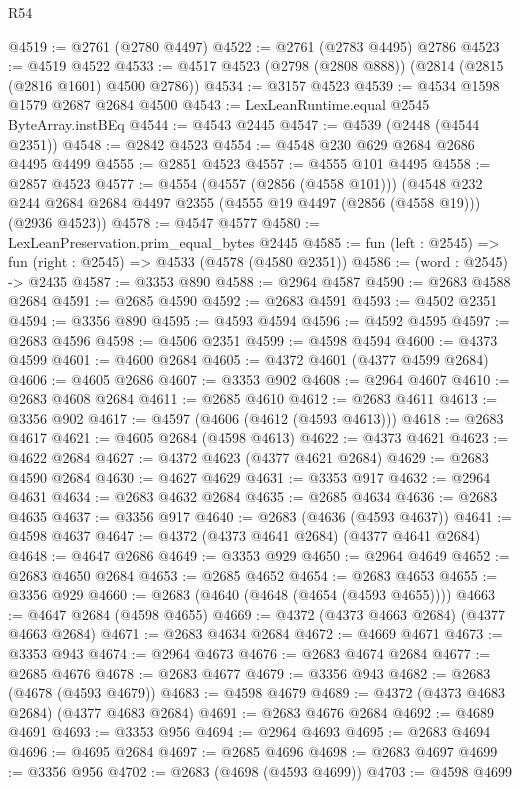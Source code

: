 \begin{lexlean}{R54}
\begin{coremodule}
@4519 := @2761 (@2780 @4497)
@4522 := @2761 (@2783 @4495) @2786
@4523 := @4519 @4522
@4533 := @4517 @4523 (@2798 (@2808 @888)) (@2814 (@2815 (@2816 @1601) @4500 @2786))
@4534 := @3157 @4523
@4539 := @4534 @1598 @1579 @2687 @2684 @4500
@4543 := LexLeanRuntime.equal @2545 ByteArray.instBEq
@4544 := @4543 @2445
@4547 := @4539 (@2448 (@4544 @2351))
@4548 := @2842 @4523
@4554 := @4548 @230 @629 @2684 @2686 @4495 @4499
@4555 := @2851 @4523
@4557 := @4555 @101 @4495
@4558 := @2857 @4523
@4577 := @4554
    (@4557 (@2856 (@4558 @101)))
    (@4548 @232 @244 @2684 @2684 @4497 @2355 (@4555 @19 @4497 (@2856 (@4558 @19))) (@2936 @4523))
@4578 := @4547 @4577
@4580 := LexLeanPreservation.prim_equal_bytes @2445
@4585 := fun (left : @2545) => fun (right : @2545) => @4533 (@4578 (@4580 @2351))
@4586 := (word : @2545) -> @2435
@4587 := @3353 @890
@4588 := @2964 @4587
@4590 := @2683 @4588 @2684
@4591 := @2685 @4590
@4592 := @2683 @4591
@4593 := @4502 @2351
@4594 := @3356 @890
@4595 := @4593 @4594
@4596 := @4592 @4595
@4597 := @2683 @4596
@4598 := @4506 @2351
@4599 := @4598 @4594
@4600 := @4373 @4599
@4601 := @4600 @2684
@4605 := @4372 @4601 (@4377 @4599 @2684)
@4606 := @4605 @2686
@4607 := @3353 @902
@4608 := @2964 @4607
@4610 := @2683 @4608 @2684
@4611 := @2685 @4610
@4612 := @2683 @4611
@4613 := @3356 @902
@4617 := @4597 (@4606 (@4612 (@4593 @4613)))
@4618 := @2683 @4617
@4621 := @4605 @2684 (@4598 @4613)
@4622 := @4373 @4621
@4623 := @4622 @2684
@4627 := @4372 @4623 (@4377 @4621 @2684)
@4629 := @2683 @4590 @2684
@4630 := @4627 @4629
@4631 := @3353 @917
@4632 := @2964 @4631
@4634 := @2683 @4632 @2684
@4635 := @2685 @4634
@4636 := @2683 @4635
@4637 := @3356 @917
@4640 := @2683 (@4636 (@4593 @4637))
@4641 := @4598 @4637
@4647 := @4372 (@4373 @4641 @2684) (@4377 @4641 @2684)
@4648 := @4647 @2686
@4649 := @3353 @929
@4650 := @2964 @4649
@4652 := @2683 @4650 @2684
@4653 := @2685 @4652
@4654 := @2683 @4653
@4655 := @3356 @929
@4660 := @2683 (@4640 (@4648 (@4654 (@4593 @4655))))
@4663 := @4647 @2684 (@4598 @4655)
@4669 := @4372 (@4373 @4663 @2684) (@4377 @4663 @2684)
@4671 := @2683 @4634 @2684
@4672 := @4669 @4671
@4673 := @3353 @943
@4674 := @2964 @4673
@4676 := @2683 @4674 @2684
@4677 := @2685 @4676
@4678 := @2683 @4677
@4679 := @3356 @943
@4682 := @2683 (@4678 (@4593 @4679))
@4683 := @4598 @4679
@4689 := @4372 (@4373 @4683 @2684) (@4377 @4683 @2684)
@4691 := @2683 @4676 @2684
@4692 := @4689 @4691
@4693 := @3353 @956
@4694 := @2964 @4693
@4695 := @2683 @4694
@4696 := @4695 @2684
@4697 := @2685 @4696
@4698 := @2683 @4697
@4699 := @3356 @956
@4702 := @2683 (@4698 (@4593 @4699))
@4703 := @4598 @4699

\end{coremodule}
\end{lexlean}
